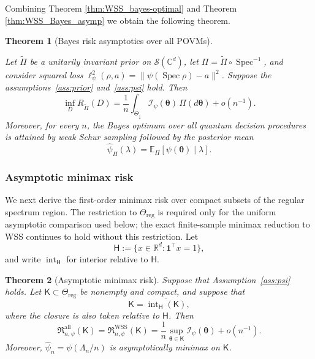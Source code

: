 \documentclass{article}
\newtheorem{theorem}{Theorem}[section]
\theoremstyle{named}
\theoremstyle{named1}
\newcommand{\R}{\mathbb{R}}
\newcommand{\E}{\mathbb{E}}
\newcommand{\WSS}{\mathrm{WSS}}
\newcommand{\btheta}{\boldsymbol{\theta}}
\newcommand{\bone}{\boldsymbol{1}}
\newcommand{\cI}{\mathcal{I}}
\newcommand{\spec}{\operatorname{Spec}}
\theoremstyle{plain}
\theoremstyle{remark}
\begin{document}
Combining Theorem \ref{thm:WSS_bayes-optimal} and Theorem \ref{thm:WSS_Bayes_asymp} we obtain the following theorem.
\begin{theorem}[Bayes risk asymptotics over all POVMs]\label{thm:bayes-optimal}

Let \(\widetilde\Pi\) be a unitarily invariant prior on \(\mathcal S(\mathbb C^d)\), let \(\Pi=\widetilde\Pi\circ\spec^{-1}\), and consider squared loss \(\ell^2_\psi(\rho,a)=\|\psi(\spec\rho)-a\|^2\).
Suppose the assumptions~\ref{ass:prior} and~\ref{ass:psi} hold. Then
\[
    \inf_D R_{\widetilde\Pi}(D)
    =\frac1n
      \int_{\Theta_{\downarrow}}
      \cI_\psi(\btheta)\,\Pi(d\btheta)
      +o(n^{-1}).
\]
Moreover, for every $n$, the Bayes optimum over all quantum
decision procedures is attained by weak Schur sampling followed by the
posterior mean
\[
    \widehat\psi_\Pi(\lambda)
    =
    \E_\Pi[\psi(\btheta)\mid\lambda].
\]
\end{theorem}

\subsubsection{Asymptotic minimax risk}

We next derive the first-order minimax risk over compact subsets of the
regular spectrum region.  The restriction to
$\Theta_{\mathrm{reg}}$ is required only for the uniform asymptotic
comparison used below; the exact finite-sample minimax reduction to WSS
continues to hold without this restriction. Let
\[
    \mathsf H:=\{x\in\R^d:\bone^\top x=1\},
\]
and write \(\operatorname{int}_{\mathsf H}\) for interior relative to
\(\mathsf H\).

\begin{theorem}[Asymptotic minimax risk]
\label{thm:wss-global-asymptotic-minimax}
Suppose that Assumption~\ref{ass:psi} holds. Let
$\mathsf K\subset\Theta_{\mathrm{reg}}$ be nonempty and compact,
and suppose that
\begin{equation}
\mathsf K
=\overline{\operatorname{int}_{\mathsf H}(\mathsf K)},
\label{eq:regular-set-interior-condition}
\end{equation}
where the closure is also taken relative to $\mathsf H$. Then
\begin{equation}
    \mathfrak R_{n,\psi}^{\mathrm{all}}(\mathsf K)
    =\mathfrak R_{n,\psi}^{\WSS}(\mathsf K)
    =\frac1n\sup_{\btheta\in\mathsf K}\cI_\psi(\btheta)
      +o(n^{-1}).
\label{eq:wss-global-asymptotic-minimax}
\end{equation}
Moreover, \(\widehat\psi_n=\psi(\Lambda_n/n)\) is asymptotically
minimax on \(\mathsf K\).
\end{theorem}
\end{document}
